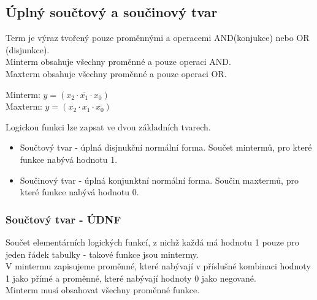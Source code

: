 \subsection{Úplný součtový a součinový tvar}
Term je výraz tvořený pouze proměnnými a operacemi AND(konjukce) nebo OR (disjunkce).\\
Minterm obsahuje všechny proměnné a pouze operaci AND.\\
Maxterm obsahuje všechny proměnné a pouze operaci OR.
\begin{center}
    Minterm: \(y = (x_2 \cdot \overline{x_1} \cdot x_0)\)\\
    Maxterm: \(y = (\overline{x_2} \cdot x_1 \cdot \overline{x_0})\)
\end{center}

Logickou funkci lze zapsat ve dvou základních tvarech.\\
\begin{itemize}
    \item Součtový tvar - úplná disjnukční normální forma. Součet mintermů, pro které funkce nabývá hodnotu 1.
    \item Součinový tvar - úplná konjunktní normální forma. Součin maxtermů, pro které funkce nabývá hodnotu 0.
\end{itemize}

\subsubsection{Součtový tvar - ÚDNF}
Součet elementárních logických funkcí, z nichž každá má hodnotu 1 pouze pro jeden řádek tabulky - takové funkce jsou mintermy.\\
V mintermu zapisujeme proměnné, které nabývají v příslušné kombinaci hodnoty 1 jako přímé a proměnné, které nabývají hodnoty 0 jako negované.\\
Minterm musí obsahovat všechny proměnné funkce.\\

